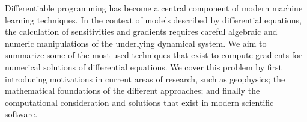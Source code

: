 Differentiable programming has become a central component of modern machine learning techniques. 
In the context of models described by differential equations, the calculation of sensitivities and gradients requires careful algebraic and numeric manipulations of the underlying dynamical system.
We aim to summarize some of the most used techniques that exist to compute gradients for numerical solutions of differential equations. 
We cover this problem by first introducing motivations in current areas of research, such as geophysics; the mathematical foundations of the different approaches; and finally the computational consideration and solutions that exist in modern scientific software. 
